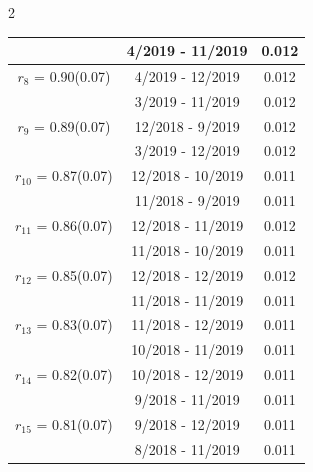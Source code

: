 \begin{multicols}{2}
{\begin{tabular}{ccc}
&        4/2019 - 11/2019 &        0.012  \vspace{-.02in} \\ \hline 
  $r_{ 8}$ = 0.90(0.07) &       4/2019 - 12/2019 &        0.012   \vspace{-.10in} \\  
&        3/2019 - 11/2019 &        0.012  \vspace{-.02in} \\ \hline 
  $r_{ 9}$ = 0.89(0.07) &      12/2018 -  9/2019 &        0.012   \vspace{-.10in} \\  
&        3/2019 - 12/2019 &        0.012  \vspace{-.02in} \\ \hline 
  $r_{10}$ = 0.87(0.07) &      12/2018 - 10/2019 &        0.011   \vspace{-.10in} \\  
&       11/2018 -  9/2019 &        0.011  \vspace{-.02in} \\ \hline 
  $r_{11}$ = 0.86(0.07) &      12/2018 - 11/2019 &        0.012   \vspace{-.10in} \\  
&       11/2018 - 10/2019 &        0.011  \vspace{-.02in} \\ \hline 
  $r_{12}$ = 0.85(0.07) &      12/2018 - 12/2019 &        0.012   \vspace{-.10in} \\  
&       11/2018 - 11/2019 &        0.011  \vspace{-.02in} \\ \hline 
  $r_{13}$ = 0.83(0.07) &      11/2018 - 12/2019 &        0.011   \vspace{-.10in} \\  
&       10/2018 - 11/2019 &        0.011  \vspace{-.02in} \\ \hline 
  $r_{14}$ = 0.82(0.07) &      10/2018 - 12/2019 &        0.011   \vspace{-.10in} \\  
&        9/2018 - 11/2019 &        0.011  \vspace{-.02in} \\ \hline 
  $r_{15}$ = 0.81(0.07) &       9/2018 - 12/2019 &        0.011   \vspace{-.10in} \\  
&        8/2018 - 11/2019 &        0.011  \vspace{-.02in} \\ \hline 

\end{tabular}}
\end{multicols}
